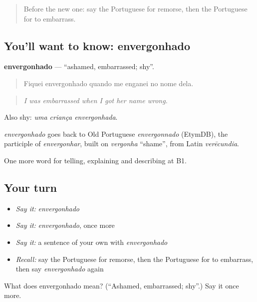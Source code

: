 \label{lesson:PT-C480-envergonhado}



\begin{quote}
Before the new one: say the Portuguese for remorse, then the Portuguese for to embarrass.
\end{quote}

\subsection*{You'll want to know: envergonhado}
\textbf{envergonhado} — \textquotedblleft{}ashamed, embarrassed; shy\textquotedblright{}.

\begin{quote}
Fiquei envergonhado quando me enganei no nome dela.
\end{quote}

\begin{quote}
\emph{I was embarrassed when I got her name wrong.}
\end{quote}

Also shy: \emph{uma criança envergonhada}.

\begin{cousinweb}
\emph{envergonhado} goes back to Old Portuguese \emph{envergonnado} (EtymDB), the participle of \emph{envergonhar}, built on \emph{vergonha} \textquotedblleft{}shame\textquotedblright{}, from Latin \emph{verēcundia}.
\end{cousinweb}

\begin{grammarlens}[title={What you've built}]
One more word for telling, explaining and describing at B1.
\end{grammarlens}

\subsection*{Your turn}
\begin{itemize}
\raggedright
  \item \emph{Say it:} \emph{envergonhado}
  \item \emph{Say it:} \emph{envergonhado}, once more
  \item \emph{Say it:} a sentence of your own with \emph{envergonhado}
  \item \emph{Recall:} say the Portuguese for remorse, then the Portuguese for to embarrass, then say \emph{envergonhado} again
\end{itemize}

\begin{tcolorbox}[breakable,colback=teal!4,colframe=teal!35!black,title={Before you move on}]
What does envergonhado mean? (\textquotedblleft{}Ashamed, embarrassed; shy\textquotedblright{}.) Say it once more.
\end{tcolorbox}
